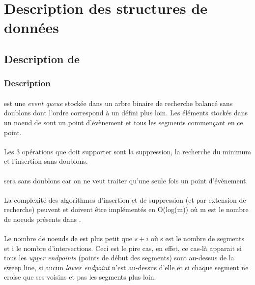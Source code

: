 \documentclass[]{article}
\begin{document}
\section{Description des structures de données}\label{sec:mainDesc}
    \subsection{Description de }\label{sub:mainQDesc}
        \subsubsection{Description}\label{subsub:QDesc}
            \paragraph{}  est une \emph{event queue} stockée dans un arbre binaire de recherche balancé sans doublons dont l'ordre correspond à un  défini plus loin. Les éléments stockés dans un noeud de  sont un point d'évènement et tous les segments commençant en ce point. 
            \paragraph{} Les 3 opérations que  doit supporter sont la suppression, la recherche du minimum et l'insertion sans doublons.
            \paragraph{}  sera sans doublons car on ne veut traiter qu'une seule fois un point d'évènement.
            \paragraph{} La complexité des algorithmes d'insertion et de suppression (et par extension de recherche) peuvent et doivent être implémentés en O(log(m)) où m est le nombre de noeuds présents dans .
            \paragraph{} Le nombre de noeuds de  est plus petit que $s + i$ où s est le nombre de segments et i le nombre d'intersections. Ceci est le pire cas, en effet, ce cas-là apparait si tous les \emph{upper endpoints} (points de début des segments) sont au-dessus de la sweep line, si aucun \emph{lower endpoint} n'est au-dessus d'elle et si chaque segment ne croise que ses voisins et pas les segments plus loin.
\end{document}
